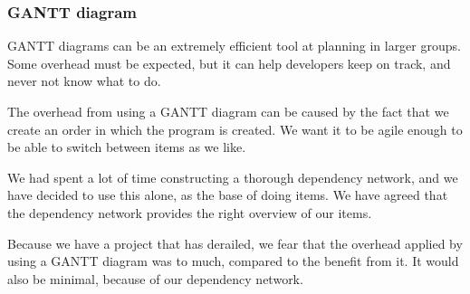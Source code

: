 \subsubsection{GANTT diagram}
GANTT diagrams can be an extremely efficient tool at planning in larger groups. Some overhead must be expected, but it can help developers keep on track, and never not know what to do.

The overhead from using a GANTT diagram can be caused by the fact that we create an order in which the program is created. We want it to be agile enough to be able to switch between items as we like.

We had spent a lot of time constructing a thorough dependency network, and we have decided to use this alone, as the base of doing items. We have agreed that the dependency network provides the right overview of our items.

Because we have a project that has derailed, we fear that the overhead applied by using a GANTT diagram was to much, compared to the benefit from it. It would also be minimal, because of our dependency network.